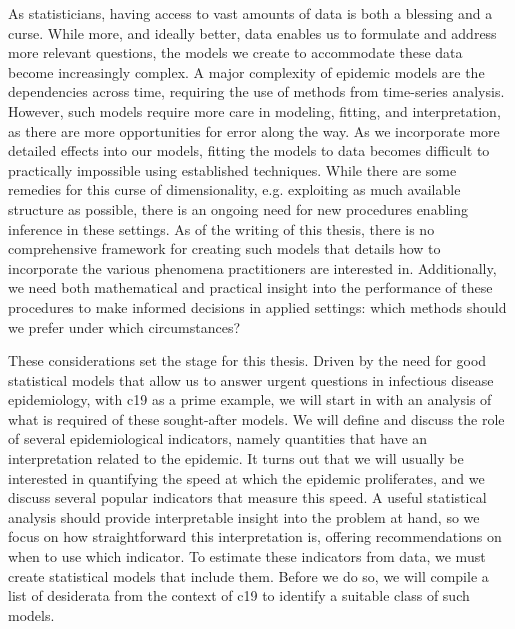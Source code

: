 %

As statisticians, having access to vast amounts of data is both a blessing and a curse. While more, and ideally better, data enables us to formulate and address more relevant questions, the models we create to accommodate these data become increasingly complex. A major complexity of epidemic models are the dependencies across time, requiring the use of methods from time-series analysis. However, such models require more care in modeling, fitting, and interpretation, as there are more opportunities for error along the way. As we incorporate more detailed effects into our models, fitting the models to data becomes difficult to practically impossible using established techniques. While there are some remedies for this curse of dimensionality, e.g. exploiting as much available structure as possible, there is an ongoing need for new procedures enabling inference in these settings. As of the writing of this thesis, there is no comprehensive framework for creating such models that details how to incorporate the various phenomena practitioners are interested in. Additionally, we need both mathematical and practical insight into the performance of these procedures to make informed decisions in applied settings: which methods should we prefer under which circumstances?

These considerations set the stage for this thesis. Driven by the need for good statistical models that allow us to answer urgent questions in infectious disease epidemiology, with \acrshort{c19} as a prime example, we will start in  with an analysis of what is required of these sought-after models. We will define and discuss the role of several epidemiological indicators, namely quantities that have an interpretation related to the epidemic. It turns out that we will usually be interested in quantifying the speed at which the epidemic proliferates, and we discuss several popular indicators that measure this speed. A useful statistical analysis should provide interpretable insight into the problem at hand, so we focus on how straightforward this interpretation is, offering recommendations on when to use which indicator. To estimate these indicators from data, we must create statistical models that include them. Before we do so, we will compile a list of desiderata from the context of \acrshort{c19} to identify a suitable class of such models. 

